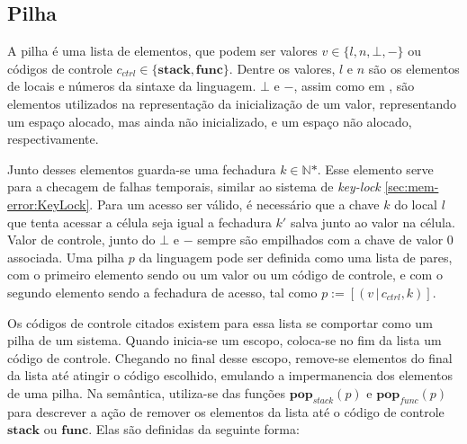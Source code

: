 

\subsection{Pilha}

A pilha é uma lista de elementos, que podem ser valores $v \in \{l, n, \bot, -\}$ ou códigos de controle $c_{ctrl} \in \{\mathbf{stack},\mathbf{func}\}$. Dentre os valores, $l$ e $n$ são os elementos de locais e números da sintaxe da linguagem. $\bot$ e $-$, assim como em \citet{WESSEL2019}, são elementos utilizados na representação da inicialização de um valor, representando um espaço alocado, mas ainda não inicializado, e um espaço não alocado, respectivamente. 

Junto desses elementos guarda-se uma fechadura $k \in \mathbb{N}\text{*}$. Esse elemento serve para a checagem de falhas temporais, similar ao sistema de \emph{key-lock} \ref{sec:mem-error:KeyLock}. Para um acesso ser válido, é necessário que a chave $k$ do local $l$ que tenta acessar a célula seja igual a fechadura $k'$ salva junto ao valor na célula. Valor de controle, junto do $\bot$ e $-$ sempre são empilhados com a chave de valor 0 associada. Uma pilha $p$ da linguagem pode ser definida como uma lista de pares, com o primeiro elemento sendo ou um valor ou um código de controle, e com o segundo elemento sendo a fechadura de acesso, tal como $p := [(v\,|\,c_{ctrl}, k)]$.

Os códigos de controle citados existem para essa lista se comportar como um pilha de um sistema. Quando inicia-se um escopo, coloca-se no fim da lista um código de controle. Chegando no final desse escopo, remove-se elementos do final da lista até atingir o código escolhido, emulando a impermanencia dos elementos de uma pilha. Na semântica, utiliza-se das funções $\mathbf{pop}_{stack}(p)$ e $\mathbf{pop}_{func}(p)$ para descrever a ação de remover os elementos da lista até o código de controle $\mathbf{stack}$ ou $\mathbf{func}$. Elas são definidas da seguinte forma:

